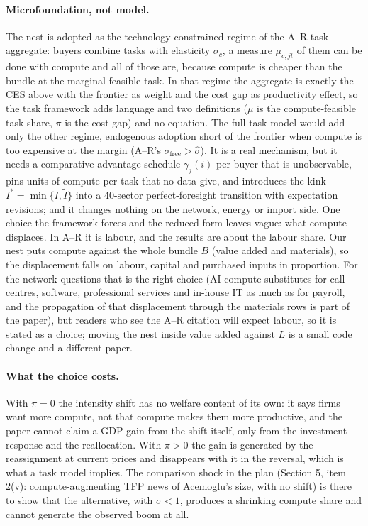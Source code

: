 \documentclass[11pt]{article}
\begin{document}
\paragraph{Microfoundation, not model.} The nest is adopted as the technology-constrained regime of the A--R task aggregate: buyers combine tasks with elasticity $\sigma_c$, a measure $\mu_{c,jt}$ of them can be done with compute and all of those are, because compute is cheaper than the bundle at the marginal feasible task. In that regime the aggregate is exactly the CES above with the frontier as weight and the cost gap as productivity effect, so the task framework adds language and two definitions ($\mu$ is the compute-feasible task share, $\pi$ is the cost gap) and no equation. The full task model would add only the other regime, endogenous adoption short of the frontier when compute is too expensive at the margin (A--R's $\sigma_{\text{free}}>\hat\sigma$). It is a real mechanism, but it needs a comparative-advantage schedule $\gamma_j(i)$ per buyer that is unobservable, pins units of compute per task that no data give, and introduces the kink $I^*=\min\{I,\tilde I\}$ into a 40-sector perfect-foresight transition with expectation revisions; and it changes nothing on the network, energy or import side. One choice the framework forces and the reduced form leaves vague: what compute displaces. In A--R it is labour, and the results are about the labour share. Our nest puts compute against the whole bundle $B$ (value added and materials), so the displacement falls on labour, capital and purchased inputs in proportion. For the network questions that is the right choice (AI compute substitutes for call centres, software, professional services and in-house IT as much as for payroll, and the propagation of that displacement through the materials rows is part of the paper), but readers who see the A--R citation will expect labour, so it is stated as a choice; moving the nest inside value added against $L$ is a small code change and a different paper.

\paragraph{What the choice costs.} With $\pi=0$ the intensity shift has no welfare content of its own: it says firms want more compute, not that compute makes them more productive, and the paper cannot claim a GDP gain from the shift itself, only from the investment response and the reallocation. With $\pi>0$ the gain is generated by the reassignment at current prices and disappears with it in the reversal, which is what a task model implies. The comparison shock in the plan (Section 5, item 2(v): compute-augmenting TFP news of Acemoglu's size, with no shift) is there to show that the alternative, with $\sigma<1$, produces a shrinking compute share and cannot generate the observed boom at all.
\end{document}
